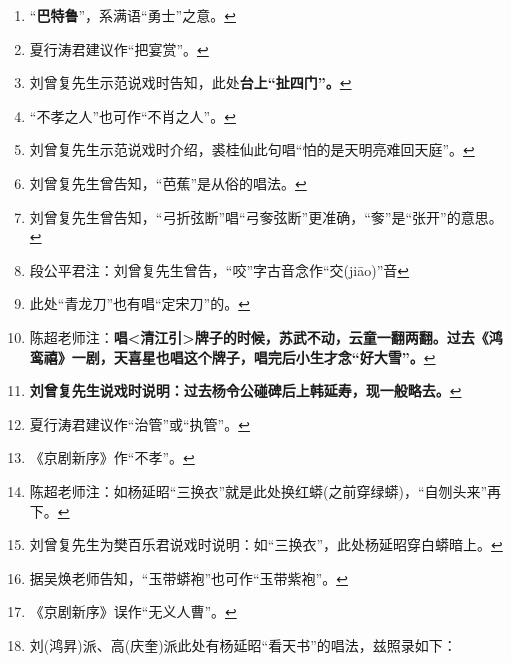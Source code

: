 \begin{enumerate}
  \protect\hyperlink{fnref445}{↩}
\item
  \leavevmode\hypertarget{fn446}{}%
  ``\textbf{巴特鲁}''，系满语``勇士''之意。\protect\hyperlink{fnref446}{↩}
\item
  \leavevmode\hypertarget{fn447}{}%
  夏行涛君建议作``把宴赏''。\protect\hyperlink{fnref447}{↩}
\item
  \leavevmode\hypertarget{fn448}{}%
  刘曾复先生示范说戏时告知，此处\textbf{台上``扯四门''。}\protect\hyperlink{fnref448}{↩}
\item
  \leavevmode\hypertarget{fn449}{}%
  ``不孝之人''也可作``不肖之人''。\protect\hyperlink{fnref449}{↩}
\item
  \leavevmode\hypertarget{fn450}{}%
  刘曾复先生示范说戏时介绍，裘桂仙此句唱``怕的是天明亮难回天庭''。\protect\hyperlink{fnref450}{↩}
\item
  \leavevmode\hypertarget{fn451}{}%
  刘曾复先生曾告知，``芭蕉''是从俗的唱法。\protect\hyperlink{fnref451}{↩}
\item
  \leavevmode\hypertarget{fn452}{}%
  刘曾复先生曾告知，``弓折弦断''唱``弓奓弦断''更准确，``奓''是``张开''的意思。\protect\hyperlink{fnref452}{↩}
\item
  \leavevmode\hypertarget{fn453}{}%
  段公平君注：刘曾复先生曾告，``咬''字古音念作``交(jiāo)''音\protect\hyperlink{fnref453}{↩}
\item
  \leavevmode\hypertarget{fn454}{}%
  此处``青龙刀''也有唱``定宋刀''的。\protect\hyperlink{fnref454}{↩}
\item
  \leavevmode\hypertarget{fn455}{}%
  陈超老师注：\textbf{唱\textless{}清江引\textgreater{}牌子的时候，苏武不动，云童一翻两翻。过去《鸿鸾禧》一剧，天喜星也唱这个牌子，唱完后小生才念``好大雪''。}\protect\hyperlink{fnref455}{↩}
\item
  \leavevmode\hypertarget{fn456}{}%
  \textbf{刘曾复先生说戏时说明：过去杨令公碰碑后上韩延寿，现一般略去。}\protect\hyperlink{fnref456}{↩}
\item
  \leavevmode\hypertarget{fn457}{}%
  夏行涛君建议作``治管''或``执管''。\protect\hyperlink{fnref457}{↩}
\item
  \leavevmode\hypertarget{fn458}{}%
  《京剧新序》作``不孝''。\protect\hyperlink{fnref458}{↩}
\item
  \leavevmode\hypertarget{fn459}{}%
  陈超老师注：如杨延昭``三换衣''就是此处换红蟒(之前穿绿蟒)，``自刎头来''再下。\protect\hyperlink{fnref459}{↩}
\item
  \leavevmode\hypertarget{fn460}{}%
  刘曾复先生为樊百乐君说戏时说明：如``三换衣''，此处杨延昭穿白蟒暗上。\protect\hyperlink{fnref460}{↩}
\item
  \leavevmode\hypertarget{fn461}{}%
  据吴焕老师告知，``玉带蟒袍''也可作``玉带紫袍''。\protect\hyperlink{fnref461}{↩}
\item
  \leavevmode\hypertarget{fn462}{}%
  《京剧新序》误作``无义人曹''。\protect\hyperlink{fnref462}{↩}
\item
  \leavevmode\hypertarget{fn463}{}%
  刘(鸿昇)派、高(庆奎)派此处有杨延昭``看天书''的唱法，兹照录如下：


\end{enumerate}
